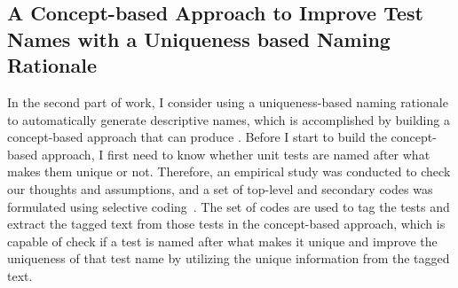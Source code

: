 \subsection{A Concept-based Approach to Improve Test Names with a Uniqueness based Naming Rationale}
\label{sec:unique-test-name}

In the second part of work, I consider using a uniqueness-based naming rationale to automatically generate descriptive names, which is accomplished by building a concept-based approach that can produce .
%
Before I start to build the concept-based approach, I first need to know whether unit tests are named after what makes them unique or not.
%
Therefore, an empirical study was conducted to check our thoughts and assumptions, and a set of top-level and secondary codes was formulated using selective coding~\cite{glaser1967discovery,strauss1998basics}.
%
The set of codes are used to tag the tests and extract the tagged text from those tests in the concept-based approach, which is capable of check if a test is named after what makes it unique and improve the uniqueness of that test name by utilizing the unique information from the tagged text.
